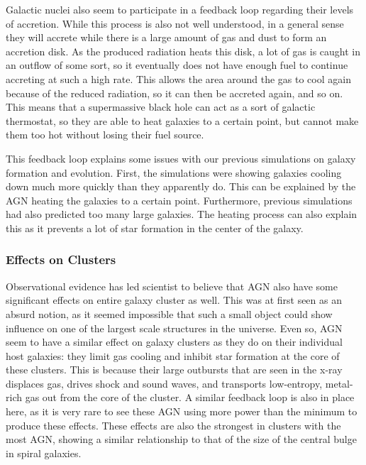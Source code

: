 \documentclass[12pt]{article}
\begin{document}
    Galactic nuclei also seem to participate in a feedback loop regarding their
    levels of accretion.  While this process is also not well understood, in a
    general sense they will accrete while there is a large amount of gas and
    dust to form an accretion disk.  As the produced radiation heats this disk,
    a lot of gas is caught in an outflow of some sort, so it eventually does not
    have enough fuel to continue accreting at such a high rate.  This allows the
    area around the gas to cool again because of the reduced radiation, so it
    can then be accreted again, and so on.  This means that a supermassive
    black hole can act as a sort of galactic thermostat, so they are able to
    heat galaxies to a certain point, but cannot make them too hot without
    losing their fuel source.

    This feedback loop explains some issues with our previous simulations on
    galaxy formation and evolution.  First, the simulations were showing
    galaxies cooling down much more quickly than they apparently do.  This can
    be explained by the AGN heating the galaxies to a certain point.
    Furthermore, previous simulations had also predicted too many large
    galaxies.  The heating process can also explain this as it prevents a lot of
    star formation in the center of the galaxy.

    \subsubsection{Effects on Clusters}
    Observational evidence has led scientist to believe that AGN also have some
    significant effects on entire galaxy cluster as well.  This was at first
    seen as an absurd notion, as it seemed impossible that such a small object
    could show influence on one of the largest scale structures in the universe.
    Even so, AGN seem to have a similar effect on galaxy clusters as they do on
    their individual host galaxies: they limit gas cooling and inhibit star
    formation at the core of these clusters.  This is because their large
    outbursts that are seen in the x-ray displaces gas, drives shock and sound
    waves, and transports low-entropy, metal-rich gas out from the core of the
    cluster.  A similar feedback loop is also in place here, as it is very rare
    to see these AGN using more power than the minimum to produce these effects.
    These effects are also the strongest in clusters with the most AGN, showing
    a similar relationship to that of the size of the central bulge in spiral
    galaxies.
\end{document}
